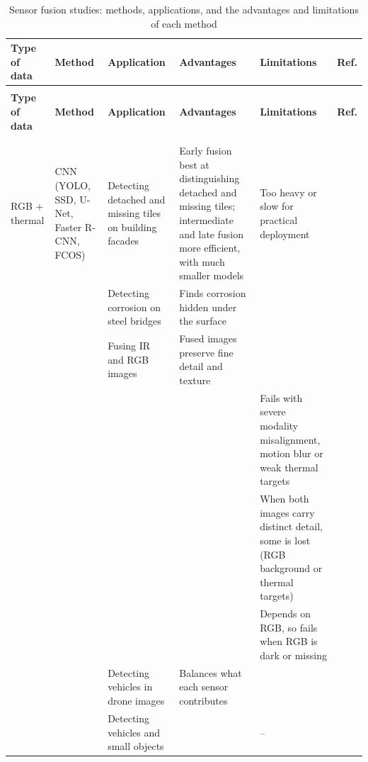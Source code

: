 {\scriptsize
\renewcommand{\arraystretch}{1.15}
\setlength{\tabcolsep}{3pt}
\begin{xltabular}{\textwidth}{>{\RaggedRight\arraybackslash}p{1.6cm}>{\RaggedRight\arraybackslash}p{2.2cm}>{\RaggedRight\arraybackslash}p{2.3cm}>{\RaggedRight\arraybackslash}X>{\RaggedRight\arraybackslash}Xp{0.95cm}}
\caption{Sensor fusion studies: methods, applications, and the advantages and limitations of each method}\label{tab:fusion-method}\\
\toprule
\textbf{Type of data} & \textbf{Method} & \textbf{Application} & \textbf{Advantages} & \textbf{Limitations} & \textbf{Ref.} \\
\midrule
\endfirsthead
{}\\
\toprule
\textbf{Type of data} & \textbf{Method} & \textbf{Application} & \textbf{Advantages} & \textbf{Limitations} & \textbf{Ref.} \\
\midrule
\endhead
\midrule{}\\
\endfoot
\bottomrule
{}\\
\endlastfoot
RGB + thermal & CNN (YOLO, SSD, U-Net, Faster R-CNN, FCOS) & Detecting detached and missing tiles on building facades & Early fusion best at distinguishing detached and missing tiles; intermediate and late fusion more efficient, with much smaller models & Too heavy or slow for practical deployment & \citep{Yang2023} \\
 &  & Detecting corrosion on steel bridges & Finds corrosion hidden under the surface &  & \citep{Lim2021} \\
 &  & Fusing IR and RGB images & Fused images preserve fine detail and texture &  & \citep{Gao2026} \\
 &  &  &  & Fails with severe modality misalignment, motion blur or weak thermal targets & \citep{Zhu2026} \\
 &  &  &  & When both images carry distinct detail, some is lost (RGB background or thermal targets) & \citep{Lin2026} \\
 &  &  &  & Depends on RGB, so fails when RGB is dark or missing & \citep{Xiao2026} \\
 &  & Detecting vehicles in drone images & Balances what each sensor contributes &  & \citep{Tang2026} \\
 &  & Detecting vehicles and small objects &  & -- & \citep{Liu2025b} \\

\end{xltabular}}
